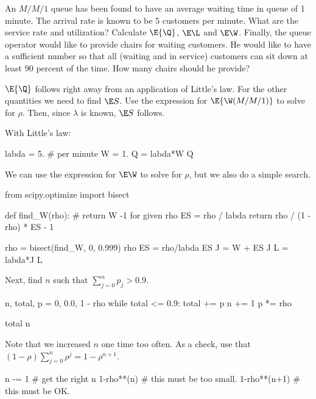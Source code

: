 \begin{exercise}[Hall 5.6]
  An $M/M/1$ queue has been found to have an average waiting time in queue of 1 minute.
  The arrival rate is known to be 5 customers per minute.
  What are the service rate and utilization?
  Calculate $\E{\Q}$, $\E \L$ and $\E\W$.
  Finally, the queue operator would like to provide chairs for waiting customers.
  He would like to have a sufficient number so that all (waiting and in service) customers can sit down at least 90 percent of the time.
  How many chairs should he provide?

\begin{hint}
  $\E{\Q}$ follows right away from an application of Little's law.
  For the other quantities we need to find $\E S$.
  Use the expression for  $\E{\W(M/M/1)}$ to solve for $\rho$. Then, since $\lambda$ is known, $\E S$ follows.
\end{hint}
\begin{solution} With Little's law:
\begin{pyconsole}
labda = 5. # per minute
W = 1.
Q = labda*W
Q
\end{pyconsole}

We can use the expression for $\E\W$ to solve for $\rho$, but we also do a simple search.
\begin{pyconsole}
from scipy.optimize import bisect


def find_W(rho): # return W -1 for given rho
    ES = rho / labda
    return rho / (1 - rho) * ES - 1


rho = bisect(find_W, 0, 0.999)
rho
ES = rho/labda
ES
J = W + ES
J
L = labda*J
L
\end{pyconsole}
Next, find $n$ such that $\sum_{j=0}^n p_j > 0.9$.
\begin{pyconsole}
n, total, p = 0, 0.0, 1 - rho
while total <= 0.9:
    total += p
    n += 1
    p *= rho

total
n
\end{pyconsole}
Note that we increased $n$ one time too often. As a check,  use that $(1-\rho) \sum_{j=0}^n \rho^j = 1-\rho^{n+1}$.
\begin{pyconsole}
n -= 1 # get the right n
1-rho**(n) # this must be too small.
1-rho**(n+1) # this must be OK.
\end{pyconsole}
\end{solution}
\end{exercise}


